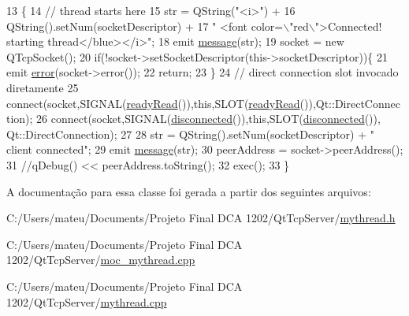 \begin{DoxyCode}
13                   \{
14   \textcolor{comment}{// thread starts here}
15   str = QString(\textcolor{stringliteral}{"<i>"}) +
16       QString().setNum(socketDescriptor) +
17       \textcolor{stringliteral}{" <font color=\(\backslash\)"red\(\backslash\)">Connected! starting thread</blue></i>"};
18   emit \mbox{\hyperlink{class_my_thread_ae49528d4ec1b2208240f707f5aa74adf}{message}}(str);
19   socket = \textcolor{keyword}{new} QTcpSocket();
20   \textcolor{keywordflow}{if}(!socket->setSocketDescriptor(this->socketDescriptor))\{
21     emit \mbox{\hyperlink{class_my_thread_aebf11d93838f22c9547d0c6aa97002be}{error}}(socket->error());
22     \textcolor{keywordflow}{return};
23   \}
24   \textcolor{comment}{// direct connection slot invocado diretamente}
25   connect(socket,SIGNAL(\mbox{\hyperlink{class_my_thread_a277618fdd448b927f2e250c2076fc176}{readyRead}}()),\textcolor{keyword}{this},SLOT(\mbox{\hyperlink{class_my_thread_a277618fdd448b927f2e250c2076fc176}{readyRead}}()),Qt::DirectConnection);
26   connect(socket,SIGNAL(\mbox{\hyperlink{class_my_thread_a447710039787ae20134a9b572487840f}{disconnected}}()),\textcolor{keyword}{this},SLOT(\mbox{\hyperlink{class_my_thread_a447710039787ae20134a9b572487840f}{disconnected}}()),
      Qt::DirectConnection);
27 
28   str = QString().setNum(socketDescriptor) + \textcolor{stringliteral}{" client connected"};
29   emit \mbox{\hyperlink{class_my_thread_ae49528d4ec1b2208240f707f5aa74adf}{message}}(str);
30   peerAddress = socket->peerAddress();
31   \textcolor{comment}{//qDebug() << peerAddress.toString();}
32   exec();
33 \}
\end{DoxyCode}


A documentação para essa classe foi gerada a partir dos seguintes arquivos\+:\begin{DoxyCompactItemize}
\item 
C\+:/\+Users/mateu/\+Documents/\+Projeto Final D\+C\+A 1202/\+Qt\+Tcp\+Server/\mbox{\hyperlink{mythread_8h}{mythread.\+h}}\item 
C\+:/\+Users/mateu/\+Documents/\+Projeto Final D\+C\+A 1202/\+Qt\+Tcp\+Server/\mbox{\hyperlink{moc__mythread_8cpp}{moc\+\_\+mythread.\+cpp}}\item 
C\+:/\+Users/mateu/\+Documents/\+Projeto Final D\+C\+A 1202/\+Qt\+Tcp\+Server/\mbox{\hyperlink{mythread_8cpp}{mythread.\+cpp}}\end{DoxyCompactItemize}
